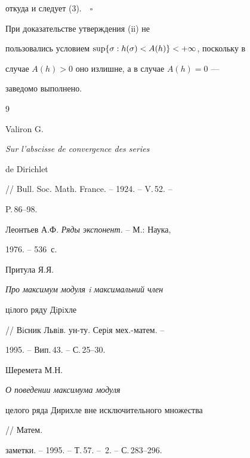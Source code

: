 откуда и следует (3).$\quad\square$





\begin{notenonum}


При доказательстве утверждения (ii) не


пользовались условием $\sup\{\sigma:h(\sigma)<A(h)\}<+\infty$, поскольку в


случае $A(h)>0$ оно излишне, а в случае $A(h)=0$ --- 


заведомо выполнено.


\end{notenonum}








\begin{thebibliography}{9}







Valiron G. {\it Sur l'abscisse de convergence des series


de Dirichlet} // Bull. Soc. Math. France. -- 1924. -- V.\,52. --


P.\,86--98. 




Леонтьев А.Ф. {\it Ряды экспонент.} -- М.: Наука,


1976. -- 536~с.




Притула Я.Я. {\it Про максимум модуля i максимальний член


цiлого ряду Дiрiхле} // Вiсник Львiв. ун-ту. Серiя мех.-матем. --


1995. -- Вип.\,43. -- С.\,25--30. 




Шеремета М.Н. {\it О поведении максимума модуля


целого ряда Дирихле вне исключительного множества} // Матем.


заметки. -- 1995. -- Т.\,57. -- \No\,2. -- С.\,283--296.





\end{thebibliography}





\vskip 2cm












\label{end}





